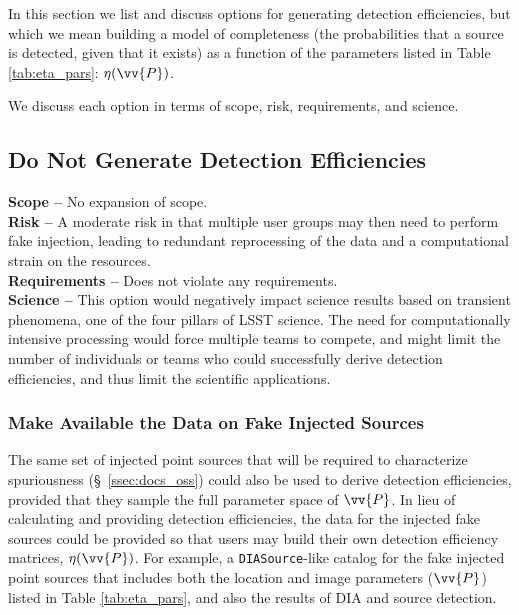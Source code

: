\documentclass[DM,lsstdraft,toc]{lsstdoc}
\begin{document}
In this section we list and discuss options for generating detection efficiencies, but which we mean building a model of completeness (the probabilities that a source is detected, given that it exists) as a function of the parameters listed in Table \ref{tab:eta_pars}: $\eta(\vv{P})$.

We discuss each option in terms of scope, risk, requirements, and science.

\subsection{Do Not Generate Detection Efficiencies}\label{ssec:DE_no}

{\bf Scope --} No expansion of scope. \\
{\bf Risk --} A moderate risk in that multiple user groups may then need to perform fake injection, leading to redundant reprocessing of the data and a computational strain on the resources. \\
{\bf Requirements --} Does not violate any requirements. \\
{\bf Science --} This option would negatively impact science results based on transient phenomena, one of the four pillars of LSST science. The need for computationally intensive processing would force multiple teams to compete, and might limit the number of individuals or teams who could successfully derive detection efficiencies, and thus limit the scientific applications.

\subsubsection{Make Available the Data on Fake Injected Sources}\label{sssec:DE_no_butmakefakeavail}

The same set of injected point sources that will be required to characterize spuriousness (\S~\ref{ssec:docs_oss}) could also be used to derive detection efficiencies, provided that they sample the full parameter space of $\vv{P}$. In lieu of calculating and providing detection efficiencies, the data for the injected fake sources could be provided so that users may build their own detection efficiency matrices, $\eta(\vv{P})$. For example, a {\tt DIASource}-like catalog for the fake injected point sources that includes both the location and image parameters ($\vv{P}$) listed in Table \ref{tab:eta_pars}, and also the results of DIA and source detection.
\end{document}
